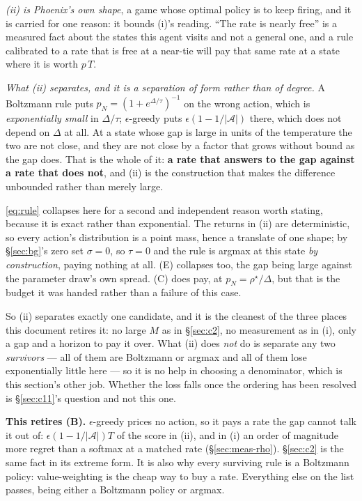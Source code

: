 \documentclass{article}
\newcommand{\actions}{\mathcal{A}}
\newcommand{\gap}{\Delta}
\newcommand{\srank}{\sigma}
\begin{document}
\emph{(ii) is Phoenix's own shape}, a game whose optimal policy is to keep firing, and it is
carried for one reason: it bounds (i)'s reading. ``The rate is nearly free'' is a measured fact
about the states this agent visits and not a general one, and a rule calibrated to a rate that is
free at a near-tie will pay that same rate at a state where it is worth $p\,T$.

\emph{What (ii) separates, and it is a separation of form rather than of degree.} A Boltzmann
rule puts $p_N = (1 + e^{\gap/\tau})^{-1}$ on the wrong action, which is \emph{exponentially
small} in $\gap/\tau$; $\epsilon$-greedy puts $\epsilon(1-1/|\actions|)$ there, which does not
depend on $\gap$ at all. At a state whose gap is large in units of the temperature the two are
not close, and they are not close by a factor that grows without bound as the gap does. That is
the whole of it: \textbf{a rate that answers to the gap against a rate that does not}, and (ii)
is the construction that makes the difference unbounded rather than merely large.

\eqref{eq:rule} collapses here for a second and independent reason worth stating, because it is
exact rather than exponential. The returns in (ii) are deterministic, so every action's
distribution is a point mass, hence a translate of one shape; by \S\ref{sec:bg}'s zero set
$\srank = 0$, so $\tau = 0$ and the rule is argmax at this state \emph{by construction}, paying
nothing at all. (E) collapses too, the gap being large against the parameter draw's own spread.
(C) does pay, at $p_N = \rho^\star/\gap$, but that is the budget it was handed rather than a
failure of this case.

So (ii) separates exactly one candidate, and it is the cleanest of the three places this document
retires it: no large $M$ as in \S\ref{sec:c2}, no measurement as in (i), only a gap and a horizon
to pay it over. What (ii) does \emph{not} do is separate any two \emph{survivors} --- all of them
are Boltzmann or argmax and all of them lose exponentially little here --- so it is no help in
choosing a denominator, which is this section's other job. Whether the loss falls once the
ordering has been resolved is \S\ref{sec:c11}'s question and not this one.

\textbf{This retires (B).} $\epsilon$-greedy prices no action, so it pays a rate the gap cannot
talk it out of: $\epsilon(1-1/|\actions|)T$ of the score in (ii), and in (i) an order of magnitude
more regret than a softmax at a matched rate (\S\ref{sec:meas-rho}). \S\ref{sec:c2} is the same
fact in its extreme form. It is also why
every surviving rule is a Boltzmann policy: value-weighting is the cheap way to buy a rate.
Everything else on the list passes, being either a Boltzmann policy or argmax.
\end{document}
